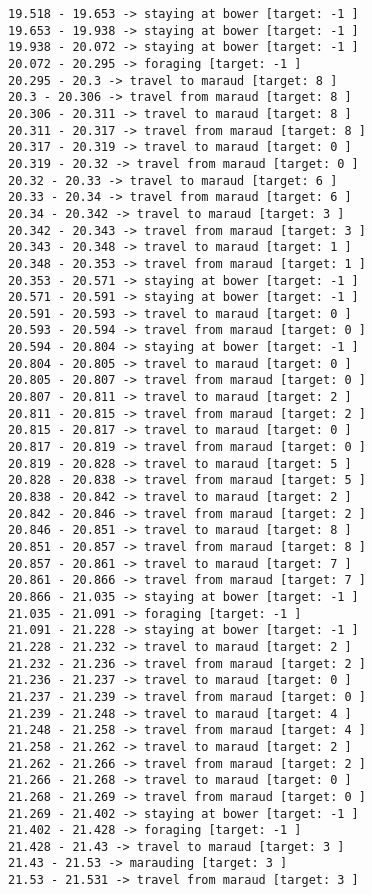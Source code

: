 \documentclass[11pt]{article}
\begin{document}
\begin{Verbatim}[commandchars=\\\{\}]
19.518 - 19.653 -> staying at bower [target: -1 ]
19.653 - 19.938 -> staying at bower [target: -1 ]
19.938 - 20.072 -> staying at bower [target: -1 ]
20.072 - 20.295 -> foraging [target: -1 ]
20.295 - 20.3 -> travel to maraud [target: 8 ]
20.3 - 20.306 -> travel from maraud [target: 8 ]
20.306 - 20.311 -> travel to maraud [target: 8 ]
20.311 - 20.317 -> travel from maraud [target: 8 ]
20.317 - 20.319 -> travel to maraud [target: 0 ]
20.319 - 20.32 -> travel from maraud [target: 0 ]
20.32 - 20.33 -> travel to maraud [target: 6 ]
20.33 - 20.34 -> travel from maraud [target: 6 ]
20.34 - 20.342 -> travel to maraud [target: 3 ]
20.342 - 20.343 -> travel from maraud [target: 3 ]
20.343 - 20.348 -> travel to maraud [target: 1 ]
20.348 - 20.353 -> travel from maraud [target: 1 ]
20.353 - 20.571 -> staying at bower [target: -1 ]
20.571 - 20.591 -> staying at bower [target: -1 ]
20.591 - 20.593 -> travel to maraud [target: 0 ]
20.593 - 20.594 -> travel from maraud [target: 0 ]
20.594 - 20.804 -> staying at bower [target: -1 ]
20.804 - 20.805 -> travel to maraud [target: 0 ]
20.805 - 20.807 -> travel from maraud [target: 0 ]
20.807 - 20.811 -> travel to maraud [target: 2 ]
20.811 - 20.815 -> travel from maraud [target: 2 ]
20.815 - 20.817 -> travel to maraud [target: 0 ]
20.817 - 20.819 -> travel from maraud [target: 0 ]
20.819 - 20.828 -> travel to maraud [target: 5 ]
20.828 - 20.838 -> travel from maraud [target: 5 ]
20.838 - 20.842 -> travel to maraud [target: 2 ]
20.842 - 20.846 -> travel from maraud [target: 2 ]
20.846 - 20.851 -> travel to maraud [target: 8 ]
20.851 - 20.857 -> travel from maraud [target: 8 ]
20.857 - 20.861 -> travel to maraud [target: 7 ]
20.861 - 20.866 -> travel from maraud [target: 7 ]
20.866 - 21.035 -> staying at bower [target: -1 ]
21.035 - 21.091 -> foraging [target: -1 ]
21.091 - 21.228 -> staying at bower [target: -1 ]
21.228 - 21.232 -> travel to maraud [target: 2 ]
21.232 - 21.236 -> travel from maraud [target: 2 ]
21.236 - 21.237 -> travel to maraud [target: 0 ]
21.237 - 21.239 -> travel from maraud [target: 0 ]
21.239 - 21.248 -> travel to maraud [target: 4 ]
21.248 - 21.258 -> travel from maraud [target: 4 ]
21.258 - 21.262 -> travel to maraud [target: 2 ]
21.262 - 21.266 -> travel from maraud [target: 2 ]
21.266 - 21.268 -> travel to maraud [target: 0 ]
21.268 - 21.269 -> travel from maraud [target: 0 ]
21.269 - 21.402 -> staying at bower [target: -1 ]
21.402 - 21.428 -> foraging [target: -1 ]
21.428 - 21.43 -> travel to maraud [target: 3 ]
21.43 - 21.53 -> marauding [target: 3 ]
21.53 - 21.531 -> travel from maraud [target: 3 ]

\end{Verbatim}
\end{document}
